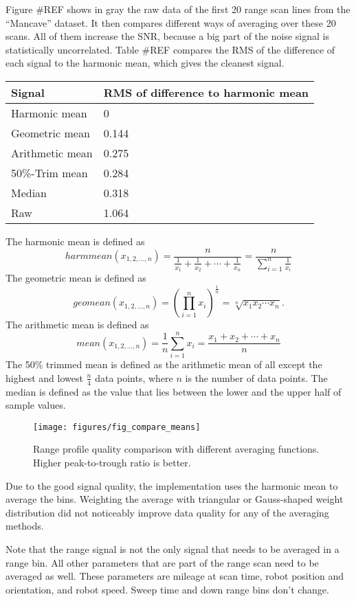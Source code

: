 Figure \#REF shows in gray the raw data of the first 20 range scan lines
from the ``Mancave'' dataset. It then compares different ways of
averaging over these 20 scans. All of them increase the SNR, because a
big part of the noise signal is statistically uncorrelated. Table \#REF
compares the RMS of the difference of each signal to the harmonic mean,
which gives the cleanest signal.

\begin{longtable}[]{@{}ll@{}}
\toprule
Signal & RMS of difference to harmonic mean\tabularnewline
\midrule
\endhead
Harmonic mean & 0\tabularnewline
Geometric mean & 0.144\tabularnewline
Arithmetic mean & 0.275\tabularnewline
50\%-Trim mean & 0.284\tabularnewline
Median & 0.318\tabularnewline
Raw & 1.064\tabularnewline
\bottomrule
\end{longtable}

The harmonic mean is defined as
\[harmmean(x_{1,2,...,n}) = \frac{n}{\frac1{x_1} + \frac1{x_2} + \cdots + \frac1{x_n}} = \frac{n}{\sum\limits_{i=1}^n \frac1{x_i}}\]
The geometric mean is defined as
\[geomean(x_{1,2,...,n}) = \left(\prod_{i=1}^n x_i \right)^\frac{1}{n} = \sqrt[n]{x_1 x_2 \cdots x_n}.\]
The arithmetic mean is defined as
\[mean(x_{1,2,...,n}) = \frac{1}{n}\sum_{i=1}^n x_i=\frac{x_1+x_2+\cdots+x_n}{n}\]
The 50\% trimmed mean is defined as the arithmetic mean of all except
the highest and lowest \(\frac{n}4\) data points, where \(n\) is the
number of data points. The median is defined as the value that lies
between the lower and the upper half of sample values.

\begin{figure}[htbp]
    \centering
    \label{fig:fig_compare_means}
    \texttt{[image: figures/fig\_compare\_means]}
    \caption{Range profile quality comparison with different averaging functions. Higher peak-to-trough ratio is better.}
\end{figure}

Due to the good signal quality, the implementation uses the harmonic
mean to average the bins. Weighting the average with triangular or
Gauss-shaped weight distribution did not noticeably improve data quality
for any of the averaging methods.

Note that the range signal is not the only signal that needs to be
averaged in a range bin. All other parameters that are part of the range
scan need to be averaged as well. These parameters are mileage at scan
time, robot position and orientation, and robot speed. Sweep time and
down range bins don't change.

